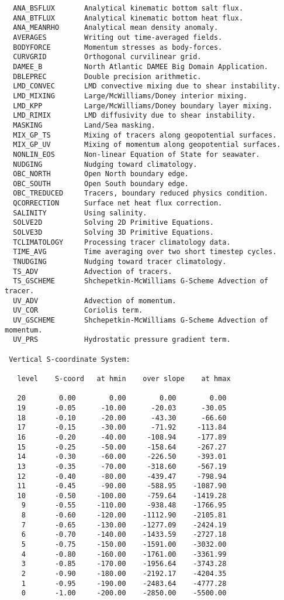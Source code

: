 \begin{verbatim}
  ANA_BSFLUX       Analytical kinematic bottom salt flux.
  ANA_BTFLUX       Analytical kinematic bottom heat flux.
  ANA_MEANRHO      Analytical mean density anomaly.
  AVERAGES         Writing out time-averaged fields.
  BODYFORCE        Momentum stresses as body-forces.
  CURVGRID         Orthogonal curvilinear grid.
  DAMEE_B          North Atlantic DAMEE Big Domain Application.
  DBLEPREC         Double precision arithmetic.
  LMD_CONVEC       LMD convective mixing due to shear instability.
  LMD_MIXING       Large/McWilliams/Doney interior mixing.
  LMD_KPP          Large/McWilliams/Doney boundary layer mixing.
  LMD_RIMIX        LMD diffusivity due to shear instability.
  MASKING          Land/Sea masking.
  MIX_GP_TS        Mixing of tracers along geopotential surfaces.
  MIX_GP_UV        Mixing of momentum along geopotential surfaces.
  NONLIN_EOS       Non-linear Equation of State for seawater.
  NUDGING          Nudging toward climatology.
  OBC_NORTH        Open North boundary edge.
  OBC_SOUTH        Open South boundary edge.
  OBC_TREDUCED     Tracers, boundary reduced physics condition.
  QCORRECTION      Surface net heat flux correction.
  SALINITY         Using salinity.
  SOLVE2D          Solving 2D Primitive Equations.
  SOLVE3D          Solving 3D Primitive Equations.
  TCLIMATOLOGY     Processing tracer climatology data.
  TIME_AVG         Time averaging over two short timestep cycles.
  TNUDGING         Nudging toward tracer climatology.
  TS_ADV           Advection of tracers.
  TS_GSCHEME       Shchepetkin-McWilliams G-Scheme Advection of tracer.
  UV_ADV           Advection of momentum.
  UV_COR           Coriolis term.
  UV_GSCHEME       Shchepetkin-McWilliams G-Scheme Advection of momentum.
  UV_PRS           Hydrostatic pressure gradient term.

 Vertical S-coordinate System: 

   level    S-coord   at hmin    over slope    at hmax

   20        0.00        0.00        0.00        0.00
   19       -0.05      -10.00      -20.03      -30.05
   18       -0.10      -20.00      -43.30      -66.60
   17       -0.15      -30.00      -71.92     -113.84
   16       -0.20      -40.00     -108.94     -177.89
   15       -0.25      -50.00     -158.64     -267.27
   14       -0.30      -60.00     -226.50     -393.01
   13       -0.35      -70.00     -318.60     -567.19
   12       -0.40      -80.00     -439.47     -798.94
   11       -0.45      -90.00     -588.95    -1087.90
   10       -0.50     -100.00     -759.64    -1419.28
    9       -0.55     -110.00     -938.48    -1766.95
    8       -0.60     -120.00    -1112.90    -2105.81
    7       -0.65     -130.00    -1277.09    -2424.19
    6       -0.70     -140.00    -1433.59    -2727.18
    5       -0.75     -150.00    -1591.00    -3032.00
    4       -0.80     -160.00    -1761.00    -3361.99
    3       -0.85     -170.00    -1956.64    -3743.28
    2       -0.90     -180.00    -2192.17    -4204.35
    1       -0.95     -190.00    -2483.64    -4777.28
    0       -1.00     -200.00    -2850.00    -5500.00


\end{verbatim}
